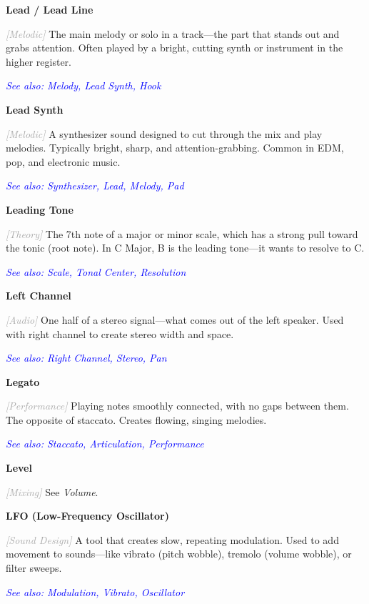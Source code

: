 \documentclass[11pt,letterpaper]{article}
\newcommand{\term}[1]{\textbf{\large\color{purple}#1}}
\newcommand{\category}[1]{\textcolor{darkgray}{\textit{\small [#1]}}}
\newcommand{\seealso}[1]{\textcolor{blue}{\textit{See also: #1}}}
\newenvironment{termdef}[1]
  {\noindent\term{#1}\par\nopagebreak}
  {\par\vspace{0.3em}}
\begin{document}
\begin{termdef}{Lead / Lead Line}
\category{Melodic}
The main melody or solo in a track—the part that stands out and grabs attention. Often played by a bright, cutting synth or instrument in the higher register.

\seealso{Melody, Lead Synth, Hook}
\end{termdef}

\begin{termdef}{Lead Synth}
\category{Melodic}
A synthesizer sound designed to cut through the mix and play melodies. Typically bright, sharp, and attention-grabbing. Common in EDM, pop, and electronic music.

\seealso{Synthesizer, Lead, Melody, Pad}
\end{termdef}

\begin{termdef}{Leading Tone}
\category{Theory}
The 7th note of a major or minor scale, which has a strong pull toward the tonic (root note). In C Major, B is the leading tone—it wants to resolve to C.

\seealso{Scale, Tonal Center, Resolution}
\end{termdef}

\begin{termdef}{Left Channel}
\category{Audio}
One half of a stereo signal—what comes out of the left speaker. Used with right channel to create stereo width and space.

\seealso{Right Channel, Stereo, Pan}
\end{termdef}

\begin{termdef}{Legato}
\category{Performance}
Playing notes smoothly connected, with no gaps between them. The opposite of staccato. Creates flowing, singing melodies.

\seealso{Staccato, Articulation, Performance}
\end{termdef}

\begin{termdef}{Level}
\category{Mixing}
See \textit{Volume}.
\end{termdef}

\begin{termdef}{LFO (Low-Frequency Oscillator)}
\category{Sound Design}
A tool that creates slow, repeating modulation. Used to add movement to sounds—like vibrato (pitch wobble), tremolo (volume wobble), or filter sweeps.

\seealso{Modulation, Vibrato, Oscillator}
\end{termdef}
\end{document}
